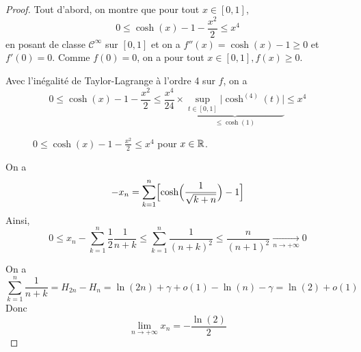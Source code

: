 \begin{proof}
	Tout d'abord, on montre que pour tout $x\in[0,1]$,
	$$0\leqslant\cosh(x)-1-\frac{x^{2}}{2}\leqslant x^{4}$$
	en posant 
	de classe $\mathcal{C}^{\infty}$ sur $[0,1]$ et on a $f''(x)=\cosh(x)-1\geqslant0$ et $f'(0)=0$. Comme $f(0)=0$, on a pour tout $x\in[0,1],f(x)\geqslant0$.

	Avec l'inégalité de Taylor-Lagrange à l'ordre 4 sur $f$, on a
	$$0\leqslant\cosh(x)-1-\frac{x^{2}}{2}\leqslant\frac{x^{4}}{24}\times\underbrace{\sup\limits_{t\in[0,1]}\vert\cosh^{(4)}(t)\vert}_{\leqslant\cosh(1)}\leqslant x^{4}$$

	\begin{figure}[ht!]
		\centering
		\caption{$0\leqslant\cosh(x)-1-\frac{x^{2}}{2}\leqslant x^{4}$ pour $x\in\mathbb{R}$.}
	\end{figure}

	On a 
	$$-x_{n}=\sum_{k=1}^{n}\Bigl[\cosh\Bigl(\frac{1}{\sqrt{k+n}}\Bigr)-1\Bigr]$$
	Ainsi, 
	$$0\leqslant x_{n}-\sum_{k=1}^{n}\frac{1}{2}\frac{1}{n+k}\leqslant\sum_{k=1}^{n}\frac{1}{(n+k)^{2}}\leqslant\frac{n}{(n+1)^{2}}\xrightarrow[n\to+\infty]{}0$$

	On a 
	$$\sum_{k=1}^{n}\frac{1}{n+k}=H_{2n}-H_{n}=\ln(2n)+\gamma+o(1)-\ln(n)-\gamma=\ln(2)+o(1)$$
	Donc 
	$$\boxed{\lim\limits_{n\to+\infty}x_{n}=-\frac{\ln(2)}{2}}$$
\end{proof}

